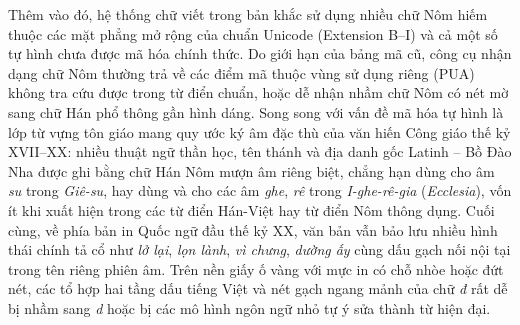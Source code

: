 Thêm vào đó, hệ thống chữ viết trong bản khắc sử dụng nhiều chữ Nôm hiếm thuộc các mặt phẳng mở rộng của chuẩn Unicode (Extension B--I) và cả một số tự hình chưa được mã hóa chính thức. Do giới hạn của bảng mã cũ, công cụ nhận dạng chữ Nôm thường trả về các điểm mã thuộc vùng sử dụng riêng (PUA) không tra cứu được trong từ điển chuẩn, hoặc dễ nhận nhầm chữ Nôm có nét mờ sang chữ Hán phổ thông gần hình dáng. Song song với vấn đề mã hóa tự hình là lớp từ vựng tôn giáo mang quy ước ký âm đặc thù của văn hiến Công giáo thế kỷ XVII--XX: nhiều thuật ngữ thần học, tên thánh và địa danh gốc Latinh -- Bồ Đào Nha được ghi bằng chữ Hán Nôm mượn âm riêng biệt, chẳng hạn dùng  cho âm \textit{su} trong \textit{Giê-su}, hay dùng  và  cho các âm \textit{ghe}, \textit{rê} trong \textit{I-ghe-rê-gia} (\textit{Ecclesia}), vốn ít khi xuất hiện trong các từ điển Hán-Việt hay từ điển Nôm thông dụng. Cuối cùng, về phía bản in Quốc ngữ đầu thế kỷ XX, văn bản vẫn bảo lưu nhiều hình thái chính tả cổ như \textit{lở lại}, \textit{lọn lành}, \textit{vì chưng}, \textit{dường ấy} cùng dấu gạch nối nội tại trong tên riêng phiên âm. Trên nền giấy ố vàng với mực in có chỗ nhòe hoặc đứt nét, các tổ hợp hai tầng dấu tiếng Việt và nét gạch ngang mảnh của chữ \textit{đ} rất dễ bị nhầm sang \textit{d} hoặc bị các mô hình ngôn ngữ nhỏ tự ý sửa thành từ hiện đại.
